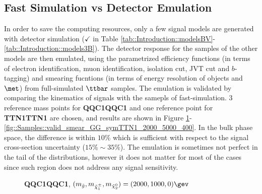 \clearpage
\subsection{Fast Simulation vs Detector Emulation} \label{sec::App::valid_smear}
In order to save the computing resources, only a few signal models are generated with detector simulation ($\checkmark$ in Table \ref{tab::Introduction::modelsBV}-\ref{tab::Introduction::models3B}).
The detector response for the samples of the other models are then emulated, using the parametrized efficiency functions (in terms of electron identification, muon identification, isolation cut, JVT cut and $b$-tagging) and smearing fucntions (in terms of energy resolution of objects and $\met$) from full-simulated $\ttbar$ samples. 
The emulation is validated by comparing the kinematics of signals with the samepls of fast-simulation.
3 reference mass points for \textbf{QQC1QQC1} and one reference point for \textbf{TTN1TTN1} are chosen, and results are shown in Figure \ref{fig::Samples::valid_smear_GG_symQQC1_2000_1000_1}-\ref{fig::Samples::valid_smear_GG_symTTN1_2000_5000_400}. 
In the bulk phase space, the difference is within $10\%$ which is sufficient with respect to the signal cross-section uncertainty ($15\%\sim35\%$).
The emulation is sometimes not perfect in the tail of the distributions, however it does not matter for most of the cases since such region does not address any signal sensitivity. 

\begin{figure}[h]
  \centering
    \caption{
        \textbf{QQC1QQC1},  $(\mG,\mC,\mN) = (2000,1000,0) \gev$
   }
   \label{fig::Samples::valid_smear_GG_symQQC1_2000_1000_1} 
\end{figure}

